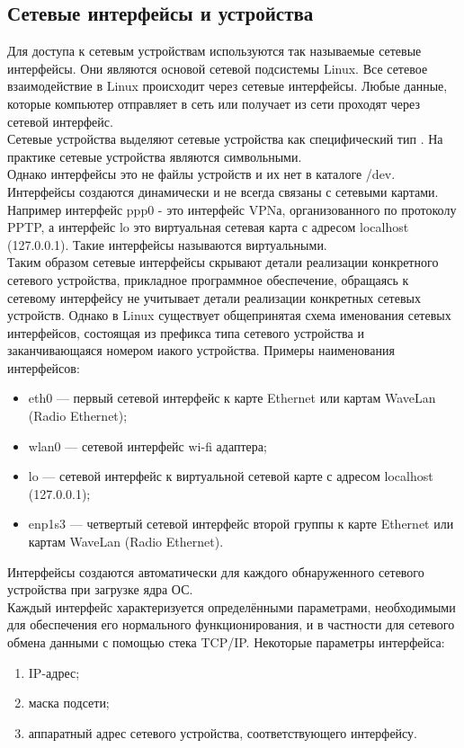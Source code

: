 \documentclass[14pt, a4paper]{extarticle}
\begin{document}
\subsection{Сетевые интерфейсы и устройства}
Для доступа к сетевым устройствам используются так называемые сетевые интерфейсы. Они являются основой сетевой подсистемы Linux. Все сетевое взаимодействие в Linux происходит через сетевые интерфейсы. Любые данные, которые компьютер отправляет в сеть или получает из сети проходят через сетевой интерфейс. \\
\indent Сетевые устройства выделяют сетевые устройства как специфический тип \cite{ldd-trans}\cite{ldd-orig}. На практике сетевые устройства являются символьными. \\
\indent Однако интерфейсы это не файлы устройств и их нет в каталоге /dev. Интерфейсы создаются динамически и не всегда связаны с сетевыми картами. Например интерфейс ppp0 - это интерфейс VPNа, организованного по протоколу PPTP, а интерфейс lo это виртуальная сетевая карта с адресом localhost (127.0.0.1). Такие интерфейсы называются виртуальными. \\
\indent Таким образом сетевые интерфейсы скрывают детали реализации конкретного сетевого устройства, прикладное программное обеспечение, обращаясь к сетевому интерфейсу не учитывает детали реализации конкретных сетевых устройств. Однако в Linux существует общепринятая схема именования сетевых интерфейсов, состоящая из префикса типа сетевого устройства и заканчивающаяся номером иакого устройства. Примеры наименования интерфейсов:
\begin{itemize}
	\item eth0 --- первый сетевой интерфейс к карте Ethernet или картам WaveLan (Radio Ethernet);
	\item wlan0 --- сетевой интерфейс wi-fi адаптера;
	\item  lo --- сетевой интерфейс к виртуальной сетевой карте с адресом localhost (127.0.0.1);
	\item  enp1s3 --- четвертый сетевой  интерфейс второй группы к карте Ethernet или картам WaveLan (Radio Ethernet).
\end{itemize}
Интерфейсы создаются автоматически для каждого обнаруженного сетевого устройства при загрузке ядра ОС. \\
\indent Каждый интерфейс характеризуется определёнными параметрами, необходимыми для обеспечения его нормального функционирования, и в частности для сетевого обмена данными с помощью стека TCP/IP. Некоторые параметры интерфейса:
\begin{enumerate}
	\item IP-адрес;
	\item маска подсети;
	\item аппаратный адрес сетевого устройства, соответствующего интерфейсу.
\end{enumerate}
\end{document}
